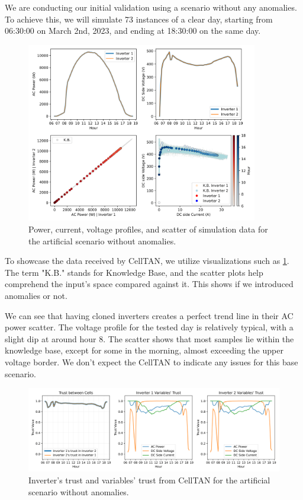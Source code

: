 We are conducting our initial validation using a scenario without any anomalies. To achieve this, we will simulate 73 instances of a clear day, starting from 06:30:00 on March 2nd, 2023, and ending at 18:30:00 on the same day.

\begin{figure}[h!]
    \centering
    \includegraphics[width=0.9\textwidth]{figures/chapter5/results/artificial/40_test_clone_01-1.png}
    \caption{Power, current, voltage profiles, and scatter of simulation data for the artificial scenario without anomalies.}
    \label{fig:artificial_01_piv}
\end{figure}

To showcase the data received by CellTAN, we utilize visualizations such as \ref{fig:artificial_01_piv}. The term "K.B." stands for Knowledge Base, and the scatter plots help comprehend the input's space compared against it. This shows if we introduced anomalies or not.

We can see that having cloned inverters creates a perfect trend line in their AC power scatter. The voltage profile for the tested day is relatively typical, with a slight dip at around hour 8. The scatter shows that most samples lie within the knowledge base, except for some in the morning, almost exceeding the upper voltage border.
We don't expect the CellTAN to indicate any issues for this base scenario.

\begin{figure}[h!]
    \centering
    \includegraphics[width=\linewidth]{figures/chapter5/results/artificial/42_results_test_clone_01-1.png}
    \caption{Inverter's trust and variables' trust from CellTAN for the artificial scenario without anomalies.}
    \label{fig:artificial_results_01}
\end{figure}

